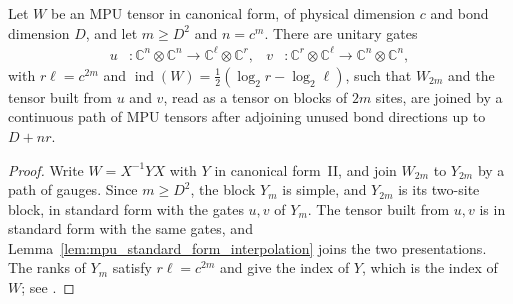 \begin{lemma}
    \label{thm:mpu_blocked_tensor_joined_to_gates}
    \leanok
    Let $W$ be an MPU tensor in canonical form, of physical dimension $c$ and
    bond dimension $D$, and let $m\geq D^2$ and $n=c^m$. There are unitary
    gates
    \begin{align}
        u                                 & :\mathbb C^n\otimes\mathbb C^n\longrightarrow
        \mathbb C^\ell\otimes\mathbb C^r, &
        v                                 & :\mathbb C^r\otimes\mathbb C^\ell\longrightarrow
        \mathbb C^n\otimes\mathbb C^n,
    \end{align}
    with $r\ell=c^{2m}$ and
    $\operatorname{ind}(W)=\tfrac12(\log_2r-\log_2\ell)$, such that $W_{2m}$
    and the tensor built from $u$ and $v$, read as a tensor on blocks of $2m$
    sites, are joined by a continuous path of MPU tensors after adjoining
    unused bond directions up to $D+nr$.
\end{lemma}

\begin{proof}\leanok
    Write $W=X^{-1}YX$ with $Y$ in canonical form~II, and join $W_{2m}$ to
    $Y_{2m}$ by a path of gauges. Since $m\geq D^2$, the block $Y_m$ is
    simple, and $Y_{2m}$ is its two-site block, in standard form with the
    gates $u,v$ of $Y_m$. The tensor built from $u,v$ is in standard form with
    the same gates, and Lemma~\ref{lem:mpu_standard_form_interpolation} joins
    the two presentations. The ranks of $Y_m$ satisfy $r\ell=c^{2m}$ and give
    the index of $Y$, which is the index of $W$; see
    \cite{gap:mpu_index_classification_tensor_to_gates}.
\end{proof}

